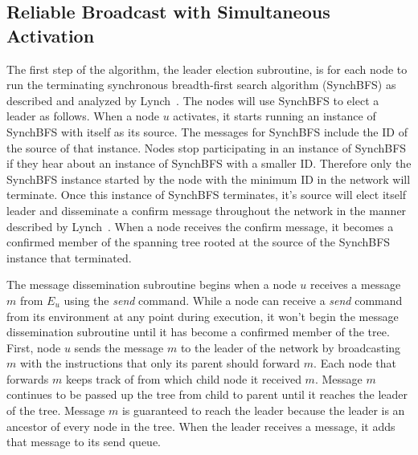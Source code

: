 \documentclass[english]{article}
\begin{document}
  \subsection {Reliable Broadcast with Simultaneous Activation}

The first step of the algorithm, the leader election subroutine, is for each node to run the terminating synchronous breadth-first search algorithm (SynchBFS) as described and analyzed by Lynch~\cite{Lynch:1996}. The nodes will use SynchBFS to elect a leader as follows. When a node $u$ activates, it starts running an instance of SynchBFS with itself as its source. The messages for SynchBFS include the ID of the source of that instance. Nodes stop participating in an instance of SynchBFS if they hear about an instance of SynchBFS with a smaller ID. Therefore only the SynchBFS instance started by the node with the minimum ID in the network will terminate. Once this instance of SynchBFS terminates, it's source will elect itself leader and disseminate a confirm message throughout the network in the manner described by Lynch~\cite{Lynch:1996}. When a node receives the confirm message, it becomes a confirmed member of the spanning tree rooted at the source of the SynchBFS instance that terminated. 

The message dissemination subroutine begins when a node $u$ receives a message $m$ from $E_u$ using the \textit{send} command. While a node can receive a \textit{send} command from its environment at any point during execution, it won't begin the message dissemination subroutine until it has become a confirmed member of the tree. First, node $u$ sends the message $m$ to the leader of the network by broadcasting $m$ with the instructions that only its parent should forward $m$. Each node that forwards $m$ keeps track of from which child node it received $m$. Message $m$ continues to be passed up the tree from child to parent until it reaches the leader of the tree. Message $m$ is guaranteed to reach the leader because the leader is an ancestor of every node in the tree. When the leader receives a message, it adds that message to its send queue.
\end{document}
